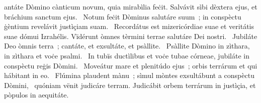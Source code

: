 \psalmChapterWithInscription{}
{ }
{%
antáte Dòmino cànticum novum, quia mirabìlia feċit. Salvávit sìbi dèxtera ejus, et bráchium sanctum ejus. 
~Notum feċit Dòminus salutáre suum~; in conspèctu ġèntium revelávit justìçiam suam. 
~Recordátus est mizericórdiae suae et veritátis suae dómui Izrahélis. Vïdérunt òmnes tèrmini terrae salutáre Dei nostri. 
~Jubiláte Deo òmnis terra~; cantáte, et exsultáte, et psàllite. 
~Psàllite Dòmino in zìthara, in zìthara et voċe psalmi. 
~In tubïs ductìlibus et voċe tubae córneae, jubiláte in conspèctu reġis Dòmini. 
~Moveátur mare et plenitúdo ejus~; orbis terrárum et qui hábitant in eo. 
~Flúmina plaudent mànu~; sìmul mòntes exsultábunt a conspèctu Dòmini, 
~quóniam vënit judicáre terram. Judicábit orbem terrárum in justìçia, et pòpulos in aequitáte. 
}
